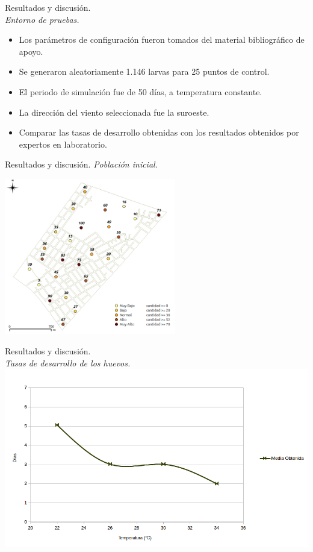 \begin{frame}[t]{Resultados y discusión.\\\textit{Entorno de pruebas.}}
\begin{itemize}
    \item Los parámetros de configuración fueron tomados del material bibliográfico de apoyo.
    \item Se generaron aleatoriamente 1.146 larvas para 25 puntos de control.
    \item El periodo de simulación fue de 50 días, a temperatura constante.
    \item La dirección del viento seleccionada fue la suroeste.
    \item Comparar las tasas de desarrollo obtenidas con los resultados obtenidos por expertos en laboratorio.
    \end{itemize}
\end{frame}

\begin{frame}[t]{Resultados y discusión. \textit{Población inicial.}}
    \begin{center}
        \includegraphics[width=7.5cm]{./graphics/extension-poblacion.png}
    \end{center}
\end{frame}

\begin{frame}[t]{Resultados y discusión.\\\textit{Tasas de desarrollo de los huevos.}}
    \includegraphics[width=\textwidth]{./graphics/huevos-desarrollo-single.png}
\end{frame}

